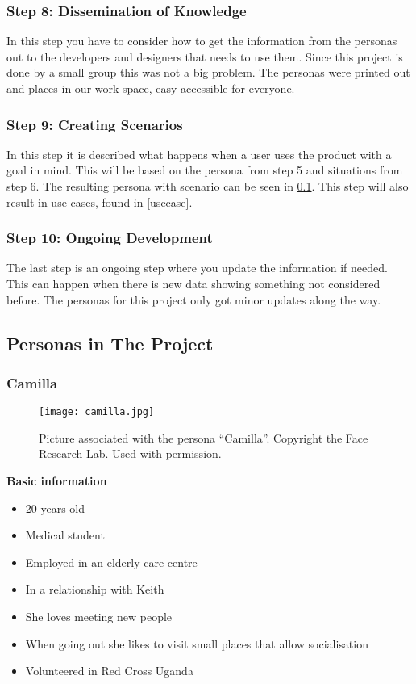 \subsubsection{Step 8: Dissemination of Knowledge}
In this step you have to consider how to get the information from the personas out to the developers and designers that needs to use them. Since this project is done by a small group this was not a big problem. The personas were printed out and places in our work space, easy accessible for everyone.

\subsubsection{Step 9: Creating Scenarios}
In this step it is described what happens when a user uses the product with a goal in mind. This will be based on the persona from step 5 and situations from step 6. The resulting persona with scenario can be seen in \cref{akkpersona}. This step will also result in use cases, found in \cref{usecase}.

\subsubsection{Step 10: Ongoing Development}
The last step is an ongoing step where you update the information if needed. This can happen when there is new data showing something not considered before. The personas for this project only got minor updates along the way.

\subsection{Personas in The Project}
\label{akkpersona}

\subsubsection{Camilla}
\begin{figure} [h]
  \centering
  \texttt{[image: camilla.jpg]}
  \caption{Picture associated with the persona \enquote{Camilla}. Copyright the Face Research Lab. Used with permission.}\label{fig:camilla}
\end{figure}
\noindent\textbf{Basic information}

\begin{itemize}
\item 20 years old
\item Medical student
\item Employed in an elderly care centre
\item In a relationship with Keith
\item She loves meeting new people
\item When going out she likes to visit small places that allow socialisation
\item Volunteered in Red Cross Uganda
\end{itemize}

